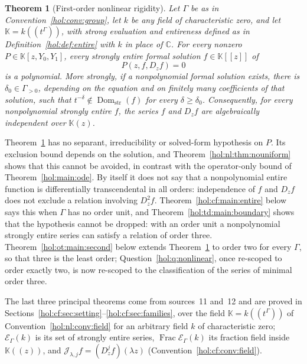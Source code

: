 \documentclass[11pt]{article}
\numberwithin{equation}{section}
\newtheorem{maintheorem}{Theorem}
\theoremstyle{definition}
\theoremstyle{remark}
\newcommand{\C}{\mathbb C}
\newcommand{\Dom}{\operatorname{Dom}_{\mathrm{str}}}
\newcommand{\KK}{\mathbb K}
\newcommand{\EK}{\mathcal E_\Gamma(k)}
\newcommand{\FE}{\operatorname{Frac}\EK}
\newcommand{\jet}[2]{\mathcal J_{#1,#2}}
\begin{document}
\begin{maintheorem}[First-order nonlinear rigidity]\label{hol:nl:main:first}
Let $\Gamma$ be as in Convention~\ref{hol:conv:group}, let $k$ be any field of
characteristic zero, and let $\KK=k((t^\Gamma))$, with strong evaluation and
entireness defined as in Definition~\ref{hol:def:entire} with $k$ in place of
$\C$. For every nonzero $P\in\KK[z,Y_0,Y_1]$, every strongly entire formal
solution $f\in\KK[[z]]$ of
\[
 P(z,f,D_zf)=0
\]
is a polynomial. More strongly, if a nonpolynomial formal solution exists,
there is $\delta_0\in\Gamma_{>0}$, depending on the equation and on finitely
many coefficients of that solution, such that $t^{-\delta}\notin\Dom(f)$ for
every $\delta\ge\delta_0$. Consequently, for every nonpolynomial strongly
entire $f$, the series $f$ and $D_zf$ are algebraically independent over
$\KK(z)$.
\end{maintheorem}

Theorem~\ref{hol:nl:main:first} has no separant, irreducibility or
solved-form hypothesis on $P$. Its exclusion bound depends on the solution,
and Theorem~\ref{hol:nl:thm:nouniform} shows that this cannot be avoided,
in contrast with the operator-only bound of Theorem~\ref{hol:main:ode}. By
itself it does not say that a nonpolynomial entire function is differentially
transcendental in all orders: independence of $f$ and $D_zf$ does not exclude
a relation involving $D_z^2f$. Theorem~\ref{hol:cf:main:entire} below says
this when $\Gamma$ has no order unit, and Theorem~\ref{hol:td:main:boundary}
shows that the hypothesis cannot be dropped: with an order unit a
nonpolynomial strongly entire series can satisfy a relation of order three.
Theorem~\ref{hol:ot:main:second} below extends Theorem~\ref{hol:nl:main:first}
to order two for every $\Gamma$, so that three is the least order;
Question~\ref{hol:q:nonlinear}, once re-scoped to order exactly two, is now
re-scoped to the classification of the series of minimal order three.

The last three principal theorems come from sources~11 and~12 and are proved
in Sections~\ref{hol:cf:sec:setting}--\ref{hol:cf:sec:families}, over the
field $\KK=k((t^\Gamma))$ of Convention~\ref{hol:nl:conv:field} for an
arbitrary field $k$ of characteristic zero; $\EK$ is its set of strongly
entire series, $\FE$ its fraction field inside $\KK((z))$, and
$\jet\lambda jf=(D_z^jf)(\lambda z)$ (Convention~\ref{hol:cf:conv:field}).
\end{document}
